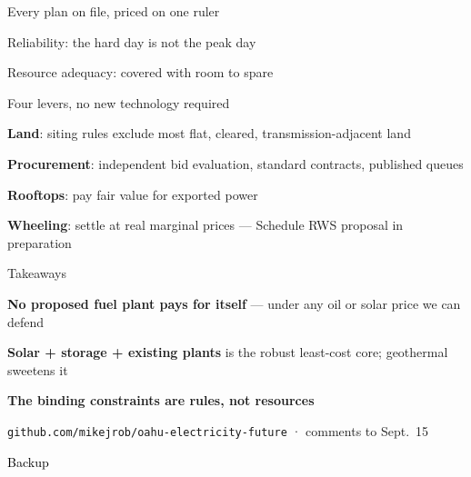 \documentclass[11pt,aspectratio=169]{beamer}
\begin{document}
\begin{frame}{Every plan on file, priced on one ruler}
\end{frame}

\begin{frame}{Reliability: the hard day is not the peak day}
\end{frame}

\begin{frame}{Resource adequacy: covered with room to spare}
\end{frame}

\begin{frame}{Four levers, no new technology required}
\begin{wideitemize}
  \item \textbf{Land}: siting rules exclude most flat, cleared,
        transmission-adjacent land
  \item \textbf{Procurement}: independent bid evaluation, standard
        contracts, published queues
  \item \textbf{Rooftops}: pay fair value for exported power
  \item \textbf{Wheeling}: settle at real marginal prices ---
        Schedule RWS proposal in preparation
\end{wideitemize}
\end{frame}

\begin{frame}{Takeaways}
\begin{wideitemize}
  \item \textbf{No proposed fuel plant pays for itself} --- under any
        oil or solar price we can defend
  \item \textbf{Solar + storage + existing plants} is the robust
        least-cost core; geothermal sweetens it
  \item \textbf{The binding constraints are rules, not resources}
\end{wideitemize}
\vspace{0.3cm}
\centering
\texttt{github.com/mikejrob/oahu-electricity-future} · comments to
Sept.\ 15
\end{frame}

\appendix
\beginbackup
\begin{transitionframe}
  \begin{center}{\Huge \textcolor{black}{Backup}}\end{center}
\end{transitionframe}
\end{document}
